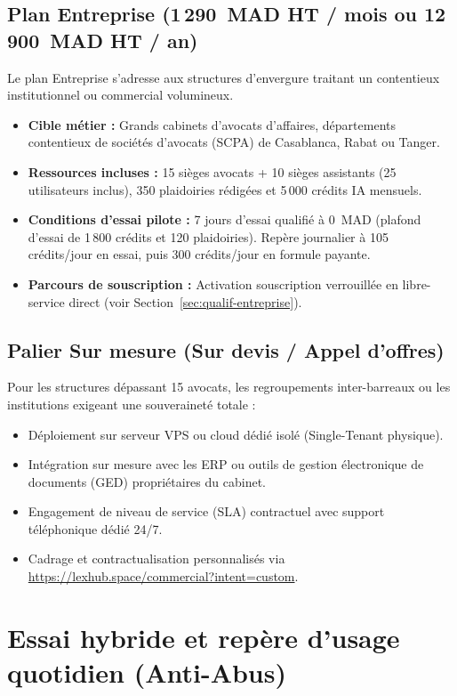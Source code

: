 \subsection{Plan Entreprise (1\,290~MAD HT / mois ou 12\,900~MAD HT / an)}
Le plan Entreprise s'adresse aux structures d'envergure traitant un contentieux institutionnel ou commercial volumineux.
\begin{itemize}[leftmargin=*]
  \item \textbf{Cible métier :} Grands cabinets d'avocats d'affaires, départements contentieux de sociétés d'avocats (SCPA) de Casablanca, Rabat ou Tanger.
  \item \textbf{Ressources incluses :} 15 sièges avocats + 10 sièges assistants (25 utilisateurs inclus), 350 plaidoiries rédigées et 5\,000 crédits IA mensuels.
  \item \textbf{Conditions d'essai pilote :} 7 jours d'essai qualifié à 0~MAD (plafond d'essai de 1\,800 crédits et 120 plaidoiries). Repère journalier à 105 crédits/jour en essai, puis 300 crédits/jour en formule payante.
  \item \textbf{Parcours de souscription :} Activation souscription verrouillée en libre-service direct (voir Section~\ref{sec:qualif-entreprise}).
\end{itemize}

\subsection{Palier Sur mesure (Sur devis / Appel d'offres)}
Pour les structures dépassant 15 avocats, les regroupements inter-barreaux ou les institutions exigeant une souveraineté totale :
\begin{itemize}[leftmargin=*]
  \item Déploiement sur serveur VPS ou cloud dédié isolé (Single-Tenant physique).
  \item Intégration sur mesure avec les ERP ou outils de gestion électronique de documents (GED) propriétaires du cabinet.
  \item Engagement de niveau de service (SLA) contractuel avec support téléphonique dédié 24/7.
  \item Cadrage et contractualisation personnalisés via \url{https://lexhub.space/commercial?intent=custom}.
\end{itemize}

\section{Essai hybride et repère d'usage quotidien (Anti-Abus)}
\label{sec:repere-jour}

